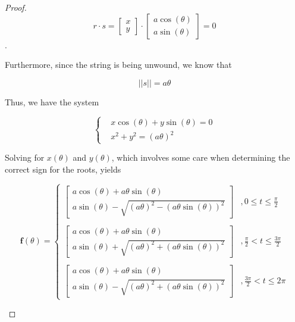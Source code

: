 \begin{exercise}
\begin{proof}
        \[ r \cdot s = \begin{bmatrix} x \\ y \end{bmatrix} \cdot \begin{bmatrix} a \cos(\theta) \\ a\sin(\theta) \end{bmatrix} = 0 \]. 
        
        Furthermore, since the string is being unwound, we know that 
        
        \[ \vert \vert s \vert \vert = a \theta \]
        
        Thus, we have the system
        
        \[
        \begin{cases}
            &x\cos(\theta) + y\sin(\theta) = 0 \\
            &x^2 + y^2 = (a\theta)^2
        \end{cases}
        \]
        
        Solving for \( x(\theta) \) and \( y(\theta) \), which involves some care when determining the correct sign for the roots, yields
        
        \[
        \mathbf{f}(\theta) = 
        \begin{cases}
            \begin{bmatrix} a\cos(\theta) + a\theta\sin(\theta) \\
            a\sin(\theta) - \sqrt{(a\theta)^2-(a\theta\sin(\theta))^2} \end{bmatrix} &, 0 \leq t \leq \frac{\pi}{2} \\
            \\
            \begin{bmatrix} a\cos(\theta) + a\theta\sin(\theta) \\
            a\sin(\theta) + \sqrt{(a\theta)^2+(a\theta\sin(\theta))^2} \end{bmatrix} &, \frac{\pi}{2} < t \leq \frac{3\pi}{2} \\
            \\
            \begin{bmatrix} a\cos(\theta) + a\theta\sin(\theta) \\
            a\sin(\theta) - \sqrt{(a\theta)^2+(a\theta\sin(\theta))^2} \end{bmatrix} &, \frac{3\pi}{2} < t \leq 2\pi
        \end{cases}
        \]

        \begin{center}
\end{center}
\end{proof}
\end{exercise}
